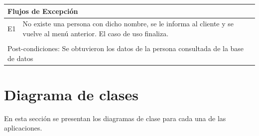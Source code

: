 \documentclass[11pt]{article}
\begin{document}
\begin{tabular}{|l|m{}|}
    \multicolumn{2}{|l|}{Flujos de Excepción} \\
    \hline
  
    E1 & No existe una persona con dicho nombre, se le informa al cliente y se vuelve al men\'u anterior. 
    El caso de uso finaliza.\\
  
    \hline
    \multicolumn{2}{|l|}{\rowcolor[gray]{.5}} \\
    \hline
  
    \multicolumn{2}{|m{0.9\textwidth}|}{Post-condiciones: Se obtuvieron los datos de la persona consultada de la base de datos} \\
  
    \hline
  \end{tabular}
  \newline









\newpage

\section{Diagrama de clases}
 En esta secci\'on se presentan los diagramas de clase para cada una de las aplicaciones.
\end{document}
